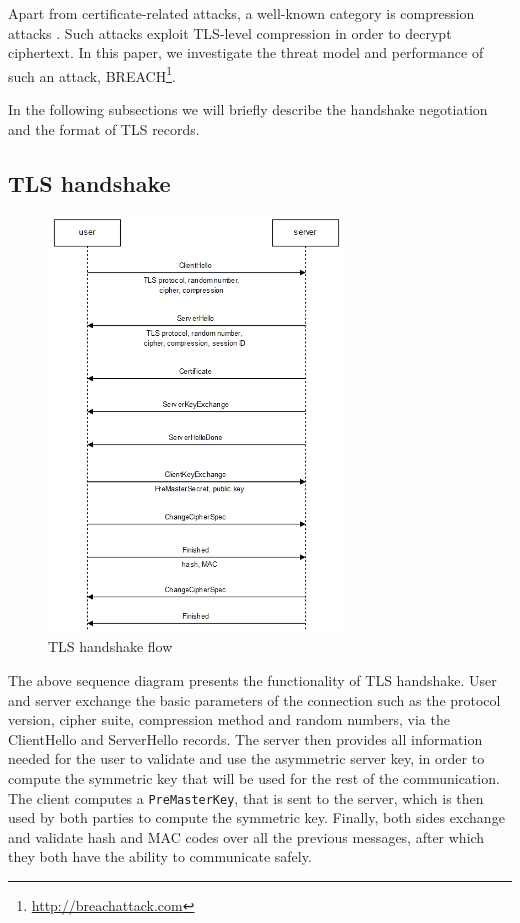 Apart from certificate-related attacks, a well-known category is compression
attacks \cite{compression_attacks}. Such attacks exploit TLS-level compression
in order to decrypt ciphertext. In this paper, we investigate the threat model
and performance of such an attack,
BREACH\footnote{\url{http://breachattack.com}}.

In the following subsections we will briefly describe the handshake negotiation
and the format of TLS records.

\subsection{TLS handshake}

\begin{figure}[H] \caption{TLS handshake flow} \centering
\includegraphics[width=0.7\textwidth]{diagrams/tls_handshake.png}\end{figure}

The above sequence diagram presents the functionality of TLS handshake. User and
server exchange the basic parameters of the connection such as the protocol
version, cipher suite, compression method and random numbers, via the
ClientHello and ServerHello records. The server then provides all information
needed for the user to validate and use the asymmetric server key, in order
to compute the symmetric key that will be used for the rest of the
communication. The client computes a \texttt{PreMasterKey}, that is sent to the
server, which is then used by both parties to compute the symmetric key.
Finally, both sides exchange and validate hash and MAC codes over all the
previous messages, after which they both have the ability to communicate safely.

